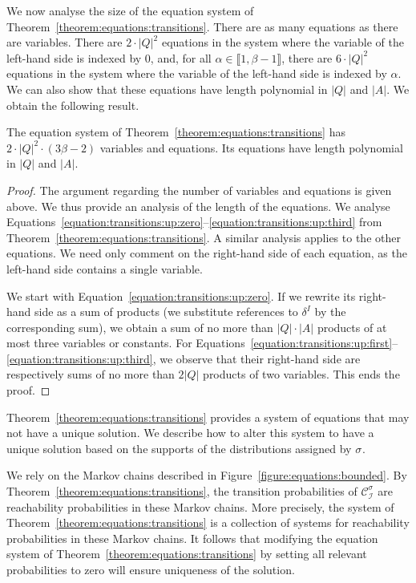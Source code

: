 \documentclass[a4paper,UKenglish,cleveref,autoref,thm-restate,colorlinks]{lipics-v2021}
\newcommand{\integerInterval}[1]{\llbracket{}#1\rrbracket{}}
\newcommand{\ocStateSpace}{Q}
\newcommand{\ocActionSpace}{A}
\newcommand{\ocTrans}{\delta}
\newcommand{\mchain}{\mathcal{C}}
\newcommand{\intPart}{\mathcal{I}}
\newcommand{\interval}{I}
\newcommand{\powerIndex}{\alpha}
\newcommand{\powerMax}{\beta}
\newcommand{\compressChainStrat}[1]{\mchain^{#1}_{\intPart}}
\newcommand{\compressChain}{\compressChainStrat{\strat}}
\newcommand{\stratGeneric}[1]{{\sigma_{#1}}}
\newcommand{\strat}{\stratGeneric{}}
\begin{document}
We now analyse the size of the equation system of Theorem~\ref{theorem:equations:transitions}.
There are as many equations as there are variables.
There are $2\cdot|\ocStateSpace|^2$ equations in the system where the variable of the left-hand side is indexed by $0$, and, for all $\powerIndex\in\integerInterval{1, \powerMax-1}$, there are $6\cdot|\ocStateSpace|^2$ equations in the system where the variable of the left-hand side is indexed by $\powerIndex$.
We can also show that these equations have length polynomial in $|\ocStateSpace|$ and $|\ocActionSpace|$.
We obtain the following result.
\begin{lemma}\label{lemma:equations:bounded:size}
  The equation system of Theorem~\ref{theorem:equations:transitions} has $2\cdot|\ocStateSpace|^2\cdot(3\powerMax-2)$ variables and equations.
  Its equations have length polynomial in $|\ocStateSpace|$ and $|\ocActionSpace|$.
\end{lemma}
\begin{proof}
  The argument regarding the number of variables and equations is given above.
  We thus provide an analysis of the length of the equations.
  We analyse Equations~\eqref{equation:transitions:up:zero}--\eqref{equation:transitions:up:third} from Theorem~\ref{theorem:equations:transitions}. A similar analysis applies to the other equations.
  We need only comment on the right-hand side of each equation, as the left-hand side contains a single variable.

  We start with Equation~\eqref{equation:transitions:up:zero}.
  If we rewrite its right-hand side as a sum of products (we substitute references to $\ocTrans^\interval$ by the corresponding sum), we obtain a sum of no more than $|\ocStateSpace|\cdot|\ocActionSpace|$ products of at most three variables or constants.
  For Equations~\eqref{equation:transitions:up:first}--\eqref{equation:transitions:up:third}, we observe that their right-hand side are respectively sums of no more than $2|\ocStateSpace|$ products of two variables.
  This ends the proof.
\end{proof}


Theorem~\ref{theorem:equations:transitions} provides a system of equations that may not have a unique solution.
We describe how to alter this system to have a unique solution based on the supports of the distributions assigned by $\strat$.

We rely on the Markov chains described in Figure~\ref{figure:equations:bounded}.
By Theorem~\ref{theorem:equations:transitions}, the transition probabilities of $\compressChain$ are reachability probabilities in these Markov chains.
More precisely, the system of Theorem~\ref{theorem:equations:transitions} is a collection of systems for reachability probabilities in these Markov chains.
It follows that modifying the equation system of Theorem~\ref{theorem:equations:transitions} by setting all relevant probabilities to zero will ensure uniqueness of the solution.
\end{document}
